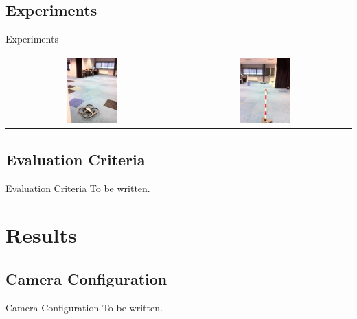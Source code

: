 \documentclass{beamer}
\begin{document}
\subsection{Experiments}
\begin{frame}
\begin{block}{Experiments}
\begin{center}
\begin{tabular}{c c}
\includegraphics[width = 0.3\textwidth]{images/experiment1.jpg} & \includegraphics[width = 0.3\textwidth]{images/experiment2.jpg}
\end{tabular}
\end{center}
\end{block}
\end{frame}

\subsection{Evaluation Criteria}
\begin{frame}
\begin{block}{Evaluation Criteria}
To be written.
\end{block}
\end{frame}

\section{Results}
\subsection{Camera Configuration}
\begin{frame}
\begin{block}{Camera Configuration}
To be written.
\end{block}
\end{frame}
\end{document}
